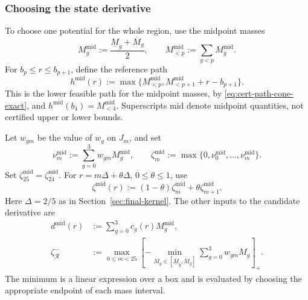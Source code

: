 \documentclass[11pt]{article}
\theoremstyle{definition}
\theoremstyle{remark}
\begin{document}
\subsubsection{Choosing the state derivative}

To choose one potential for the whole region, use the midpoint masses
\[
 M_g^{\mathrm{mid}}:=\frac{\underline M_g+\overline M_g}{2},
 \qquad M_{<p}^{\mathrm{mid}}:=\sum_{g<p}M_g^{\mathrm{mid}}.
\]
For $b_p\le r\le b_{p+1}$, define the reference path
\begin{equation}\label{eq:cert-potential-anchor}
 h^{\mathrm{mid}}(r)
 :=\max\{M_{<p}^{\mathrm{mid}},M_{<p+1}^{\mathrm{mid}}+r-b_{p+1}\}.
\end{equation}
This is the lower feasible path for the midpoint masses, by
\eqref{eq:cert-path-cone-exact}, and $h^{\mathrm{mid}}(b_4)=M_{<4}^{\mathrm{mid}}$.
Superscripts $\mathrm{mid}$ denote midpoint quantities, not certified
upper or lower bounds.

Let $w_{gm}$ be the value of $w_g$ on $J_m$, and set
\[
 \nu_m^{\mathrm{mid}}:=\sum_{g=0}^3w_{gm}M_g^{\mathrm{mid}},\qquad
 \zeta_m^{\mathrm{mid}}:=\max\{0,\nu_0^{\mathrm{mid}},\ldots,
                                     \nu_m^{\mathrm{mid}}\}.
\]
Set $\zeta_{25}^{\mathrm{mid}}=\zeta_{24}^{\mathrm{mid}}$.
For $r=m\Delta+\theta\Delta$, $0\le\theta\le1$, use
\begin{equation}\label{eq:cert-potential-zeta}
 \zeta^{\mathrm{mid}}(r)
 :=(1-\theta)\zeta_m^{\mathrm{mid}}+\theta\zeta_{m+1}^{\mathrm{mid}}.
\end{equation}
Here $\Delta=2/5$ as in Section~\ref{sec:final-kernel}.
The other inputs to the candidate derivative are
\begin{align}
 d^{\mathrm{mid}}(r)&:=\sum_{g=0}^3c_g(r)M_g^{\mathrm{mid}},
 \label{eq:cert-potential-midpoint-d}\\
 \zeta_{\mathcal R}^-&:=\max_{0\le m<25}
 \left[-\min_{M_g\in[\underline M_g,\overline M_g]}
                     \sum_{g=0}^3w_{gm}M_g\right]_+.
 \label{eq:cert-potential-negative-z}
\end{align}
The minimum is a linear expression over a box and is evaluated by
choosing the appropriate endpoint of each mass interval.
\end{document}

